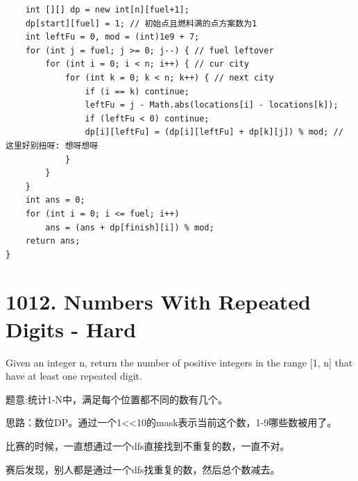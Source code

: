 \documentclass[9pt, b5paaper]{book}
\begin{document}
\begin{verbatim}
    int [][] dp = new int[n][fuel+1];
    dp[start][fuel] = 1; // 初始点且燃料满的点方案数为1
    int leftFu = 0, mod = (int)1e9 + 7;
    for (int j = fuel; j >= 0; j--) { // fuel leftover
        for (int i = 0; i < n; i++) { // cur city
            for (int k = 0; k < n; k++) { // next city
                if (i == k) continue;
                leftFu = j - Math.abs(locations[i] - locations[k]);
                if (leftFu < 0) continue;
                dp[i][leftFu] = (dp[i][leftFu] + dp[k][j]) % mod; // 这里好别扭呀: 想呀想呀 
            }
        }
    }
    int ans = 0;
    for (int i = 0; i <= fuel; i++) 
        ans = (ans + dp[finish][i]) % mod;
    return ans;
}
\end{verbatim}

\section{1012. Numbers With Repeated Digits - Hard}
\label{sec-1-13}
Given an integer n, return the number of positive integers in the range [1, n] that have at least one repeated digit.

题意:统计1-N中，满足每个位置都不同的数有几个。

思路：数位DP。通过一个1<<10的mask表示当前这个数，1-9哪些数被用了。

比赛的时候，一直想通过一个dfs直接找到不重复的数，一直不对。

赛后发现，别人都是通过一个dfs找重复的数，然后总个数减去。
\end{document}
